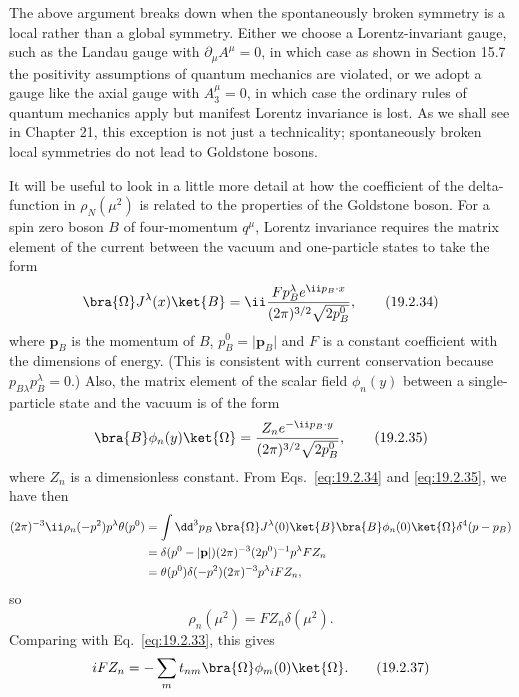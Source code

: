 The above argument breaks down when the spontaneously broken symmetry is a
local rather than a global symmetry. Either we choose a Lorentz-invariant
gauge, such as the Landau gauge with $\partial_\mu A^\mu=0$, in which case as
shown in Section 15.7 the positivity assumptions of quantum mechanics are
violated, or we adopt a gauge like the axial gauge with $A^\mu_3=0$, in which
case the ordinary rules of quantum mechanics apply but manifest Lorentz
invariance is lost. As we shall see in Chapter 21, this exception is not just
a technicality; spontaneously broken local symmetries do not lead to
Goldstone bosons.

It will be useful to look in a little more detail at how the coefficient of
the delta-function in $\rho_N(\mu^2)$ is related to the properties of the
Goldstone boson. For a spin zero boson $B$ of four-momentum $q^\mu$, Lorentz
invariance requires the matrix element of the current between the vacuum and
one-particle states to take the form
\begin{equation}
 \bra{\Omega}J^\lambda(x)\ket{B}
 =\ii\frac{Fp_B^\lambda e^{\ii p_B\cdot x}}
 {(2\pi)^{3/2}\sqrt{2p_B^0}},
 \tag{19.2.34}\label{eq:19.2.34}
\end{equation}
where $\mathbf p_B$ is the momentum of $B$, $p_B^0=\lvert\mathbf p_B\rvert$
and $F$ is a constant coefficient with the dimensions of energy. (This is
consistent with current conservation because $p_{B\lambda}p_B^\lambda=0$.)
Also, the matrix element of the scalar field $\phi_n(y)$ between a
single-particle state and the vacuum is of the form
\begin{equation}
 \bra{B}\phi_n(y)\ket{\Omega}
 =\frac{Z_ne^{-\ii p_B\cdot y}}
 {(2\pi)^{3/2}\sqrt{2p_B^0}},
 \tag{19.2.35}\label{eq:19.2.35}
\end{equation}
where $Z_n$ is a dimensionless constant. From Eqs.~\eqref{eq:19.2.34} and
\eqref{eq:19.2.35}, we have then
\begin{align*}
 (2\pi)^{-3}\ii\rho_n(-p^2)p^\lambda\theta(p^0)
 &=
 \int \dd^3p_B\,
 \bra{\Omega}J^\lambda(0)\ket{B}
 \bra{B}\phi_n(0)\ket{\Omega}\delta^4(p-p_B)
 \\
 &=
 \delta(p^0-\lvert\mathbf p\rvert)(2\pi)^{-3}
 (2p^0)^{-1}p^\lambda FZ_n
 \\
 &=
 \theta(p^0)\delta(-p^2)(2\pi)^{-3}p^\lambda iFZ_n,
\end{align*}
so
\begin{equation}
 \rho_n(\mu^2)=FZ_n\delta(\mu^2).
 \tag{19.2.36}\label{eq:19.2.36}
\end{equation}
Comparing with Eq.~\eqref{eq:19.2.33}, this gives
\begin{equation}
 iFZ_n=-\sum_m t_{nm}\bra{\Omega}\phi_m(0)\ket{\Omega}.
 \tag{19.2.37}\label{eq:19.2.37}
\end{equation}

